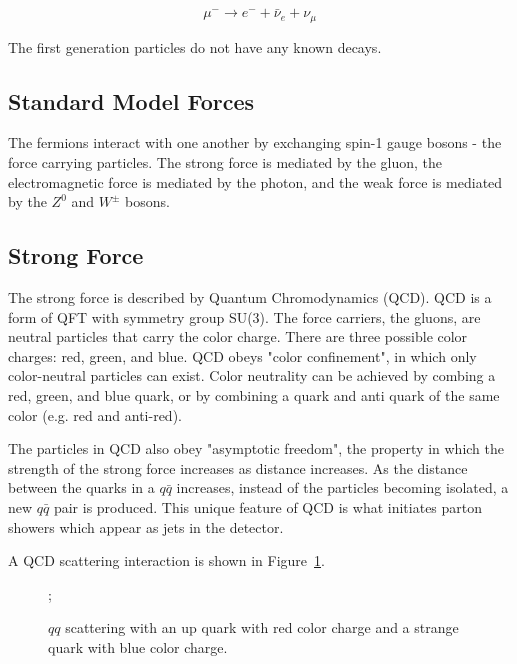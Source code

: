 \begin{equation}
	\mu^{-} \rightarrow e^{-} + \bar{\nu}_e + \nu_\mu
\end{equation}

 The first generation particles do not have any known decays.


\subsection{Standard Model Forces}

The fermions interact with one another by exchanging spin-1 gauge bosons - the force carrying particles. The strong force is mediated by the gluon, the electromagnetic force is mediated by the photon, and the weak force is mediated by the $Z^0$ and $W^{\pm}$ bosons. 

\subsection*{Strong Force}

The strong force is described by Quantum Chromodynamics (QCD). QCD is a form of QFT with symmetry group SU(3). The force carriers, the gluons, are neutral particles that carry the color charge. There are three possible color charges: red, green, and blue. QCD obeys "color confinement", in which only color-neutral particles can exist. Color neutrality can be achieved by combing a red, green, and blue quark, or by combining a quark and anti quark of the same color (e.g. red and anti-red).

The particles in QCD also obey "asymptotic freedom", the property in which the strength of the strong force increases as distance increases. As the distance between the quarks in a $q\bar{q}$ increases, instead of the particles becoming isolated, a new $q\bar{q}$ pair is produced. This unique feature of QCD is what initiates parton showers which appear as jets in the detector.

A QCD scattering interaction is shown in Figure~\ref{fig:feynman_qq}.

\begin{figure}[h!]
	\centering
	;
	\caption{$qq$ scattering with an up quark with red color charge and a strange quark with blue color charge.}
	\label{fig:feynman_qq}
\end{figure} 



